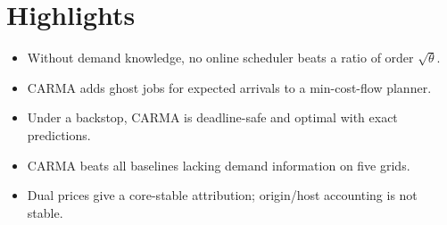 \documentclass[12pt]{article}
\begin{document}
\section*{Highlights}
\begin{itemize}
\item Without demand knowledge, no online scheduler beats a ratio of order $\sqrt{\theta}$.
\item CARMA adds ghost jobs for expected arrivals to a min-cost-flow planner.
\item Under a backstop, CARMA is deadline-safe and optimal with exact predictions.
\item CARMA beats all baselines lacking demand information on five grids.
\item Dual prices give a core-stable attribution; origin/host accounting is not stable.
\end{itemize}
\end{document}
